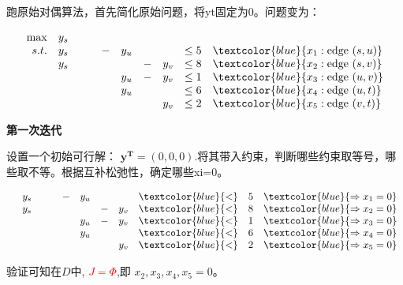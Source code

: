 跑原始对偶算法，首先简化原始问题，将yt固定为0。问题变为：
\begin{small}
\[
\begin{array}{rrrrrrrrrl}
 \max & y_s   & &   \\
 s.t. & y_s & &      &-& y_u & &     &  \leq 5 & \textcolor{blue}{x_{1}: \text{edge } (s,u)}  \\
      & y_s & &      & &     &-& y_v &  \leq 8 & \textcolor{blue}{x_{2}: \text{edge } (s,v)}   \\
      &     & &      & & y_u &-& y_v &  \leq 1 & \textcolor{blue}{x_{3}: \text{edge } (u,v)}  \\
      &     & &    &   & y_u & &     &  \leq 6 & \textcolor{blue}{x_{4}: \text{edge } (u,t)}  \\
      &     & &   & &     & & y_v &  \leq 2 & \textcolor{blue}{x_{5}: \text{edge } (v,t) } \\
\end{array} \nonumber
\]
\end{small}


\textbf{第一次迭代}

设置一个初始可行解： $\mathbf{y^T} = (0, 0, 0)$.将其带入约束，判断哪些约束取等号，哪些取不等。根据互补松弛性，确定哪些xi=0。
 \begin{small}
\[
\begin{array}{rrrrrrrrrrl}
 & y_s & &      &-& y_u & &     &  \textcolor{blue}{<}& 5 &  \textcolor{blue}{\Rightarrow  x_{1}  = 0}   \\
 & y_s & &      & &     &-& y_v &   \textcolor{blue}{<}&  8 & \textcolor{blue}{\Rightarrow  x_{2}  = 0}  \\
  &     & &      & & y_u &-& y_v &   \textcolor{blue}{<}&  1 & \textcolor{blue}{\Rightarrow  x_{3}  = 0} \\
 &     & &    &   & y_u & &     &   \textcolor{blue}{<}&  6 & \textcolor{blue}{\Rightarrow  x_{4}  = 0}  \\
 &     & &   & &     & & y_v &   \textcolor{blue}{<}&  2 & \textcolor{blue}{\Rightarrow  x_{5}  = 0}
\end{array} \nonumber
\]
\end{small}
验证可知在$D$中, \textcolor{red}{$J=\Phi$},即 $x_2,x_3,x_4,x_5=0$。

